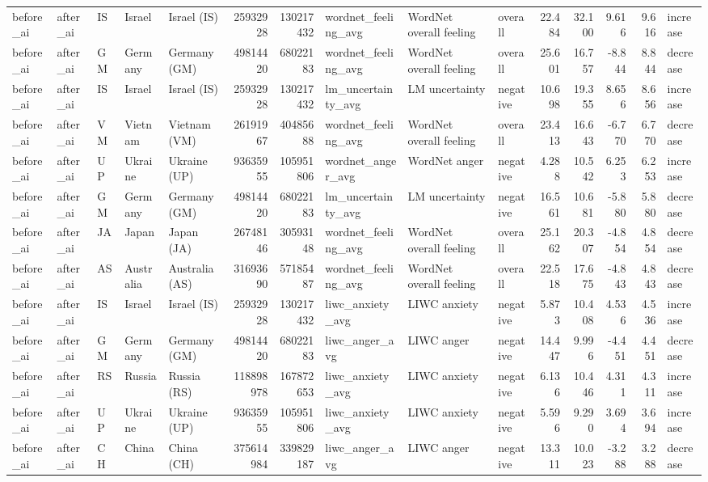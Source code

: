 \begin{tabular}{lllllrrlllrrrrl}
before\_ai & after\_ai & IS & Israel & Israel (IS) & 25932928 & 130217432 & wordnet\_feeling\_avg & WordNet overall feeling & overall & 22.484 & 32.100 & 9.616 & 9.616 & increase \\
before\_ai & after\_ai & GM & Germany & Germany (GM) & 49814420 & 68022183 & wordnet\_feeling\_avg & WordNet overall feeling & overall & 25.601 & 16.757 & -8.844 & 8.844 & decrease \\
before\_ai & after\_ai & IS & Israel & Israel (IS) & 25932928 & 130217432 & lm\_uncertainty\_avg & LM uncertainty & negative & 10.698 & 19.355 & 8.656 & 8.656 & increase \\
before\_ai & after\_ai & VM & Vietnam & Vietnam (VM) & 26191967 & 40485688 & wordnet\_feeling\_avg & WordNet overall feeling & overall & 23.413 & 16.643 & -6.770 & 6.770 & decrease \\
before\_ai & after\_ai & UP & Ukraine & Ukraine (UP) & 93635955 & 105951806 & wordnet\_anger\_avg & WordNet anger & negative & 4.288 & 10.542 & 6.253 & 6.253 & increase \\
before\_ai & after\_ai & GM & Germany & Germany (GM) & 49814420 & 68022183 & lm\_uncertainty\_avg & LM uncertainty & negative & 16.561 & 10.681 & -5.880 & 5.880 & decrease \\
before\_ai & after\_ai & JA & Japan & Japan (JA) & 26748146 & 30593148 & wordnet\_feeling\_avg & WordNet overall feeling & overall & 25.162 & 20.307 & -4.854 & 4.854 & decrease \\
before\_ai & after\_ai & AS & Australia & Australia (AS) & 31693690 & 57185487 & wordnet\_feeling\_avg & WordNet overall feeling & overall & 22.518 & 17.675 & -4.843 & 4.843 & decrease \\
before\_ai & after\_ai & IS & Israel & Israel (IS) & 25932928 & 130217432 & liwc\_anxiety\_avg & LIWC anxiety & negative & 5.873 & 10.408 & 4.536 & 4.536 & increase \\
before\_ai & after\_ai & GM & Germany & Germany (GM) & 49814420 & 68022183 & liwc\_anger\_avg & LIWC anger & negative & 14.447 & 9.996 & -4.451 & 4.451 & decrease \\
before\_ai & after\_ai & RS & Russia & Russia (RS) & 118898978 & 167872653 & liwc\_anxiety\_avg & LIWC anxiety & negative & 6.136 & 10.446 & 4.311 & 4.311 & increase \\
before\_ai & after\_ai & UP & Ukraine & Ukraine (UP) & 93635955 & 105951806 & liwc\_anxiety\_avg & LIWC anxiety & negative & 5.596 & 9.290 & 3.694 & 3.694 & increase \\
before\_ai & after\_ai & CH & China & China (CH) & 375614984 & 339829187 & liwc\_anger\_avg & LIWC anger & negative & 13.311 & 10.023 & -3.288 & 3.288 & decrease \\

\end{tabular}

